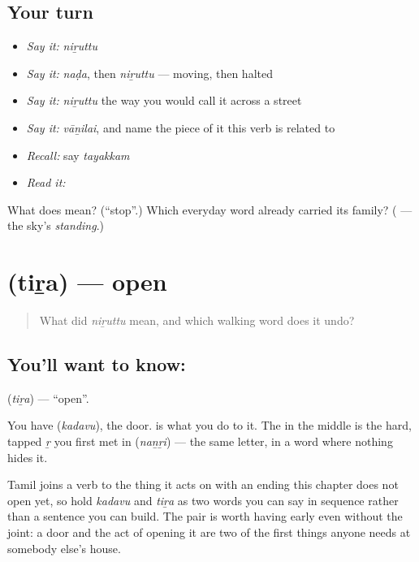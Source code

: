 \subsection*{Your turn}
\begin{itemize}
\raggedright
  \item \emph{Say it:} \emph{niṟuttu}
  \item \emph{Say it:} \emph{naḍa}, then \emph{niṟuttu} — moving, then halted
  \item \emph{Say it:} \emph{niṟuttu} the way you would call it across a street
  \item \emph{Say it:} \emph{vāṉilai}, and name the piece of it this verb is related to
  \item \emph{Recall:} say \emph{tayakkam}
  \item \emph{Read it:} \textbf{}
\end{itemize}

\begin{tcolorbox}[breakable,colback=teal!4,colframe=teal!35!black,title={Before you move on}]
What does  mean? (\textquotedblleft{}stop\textquotedblright{}.) Which everyday word already carried its family? (\textbf{} — the sky's \emph{standing}.)
\end{tcolorbox}
\section[\texorpdfstring{\ta{திற} (tiṟa)}{திற (tiṟa)}]{ (tiṟa) — open}

\label{lesson:TA-C65-open}



\begin{quote}
What did \emph{niṟuttu} mean, and which walking word does it undo?
\end{quote}

\subsection*{You'll want to know: }
\textbf{} (\emph{tiṟa}) — \textquotedblleft{}open\textquotedblright{}.

You have  (\emph{kadavu}), the door.  is what you do to it. The \textbf{} in the middle is the hard, tapped \emph{ṟ} you first met in  (\emph{naṉṟi}) — the same letter, in a word where nothing hides it.

Tamil joins a verb to the thing it acts on with an ending this chapter does not open yet, so hold \emph{kadavu} and \emph{tiṟa} as two words you can say in sequence rather than a sentence you can build. The pair is worth having early even without the joint: a door and the act of opening it are two of the first things anyone needs at somebody else's house.

